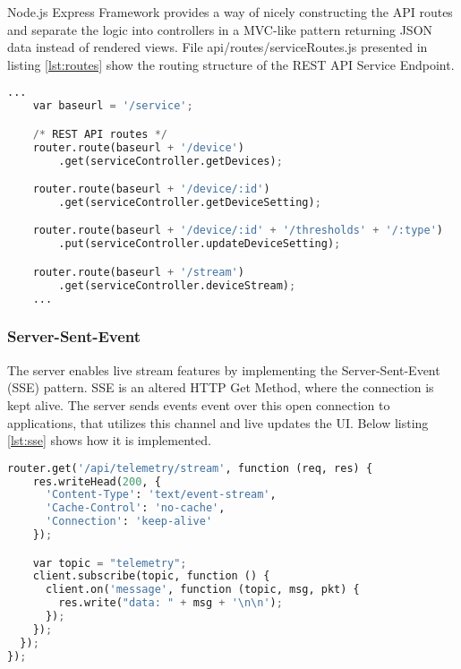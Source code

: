     Node.js Express Framework provides a way of nicely constructing the API routes and separate the logic into controllers in a MVC-like pattern returning JSON data instead of rendered views. File api/routes/serviceRoutes.js presented in listing \ref{lst:routes} show the routing structure of the REST API Service Endpoint. 

\begin{lstlisting}[language=Python, caption=Node.js REST API Routes, label={lst:routes}, basicstyle=\tiny]
    ...
    var baseurl = '/service';

    /* REST API routes */
    router.route(baseurl + '/device')
        .get(serviceController.getDevices);

    router.route(baseurl + '/device/:id')
        .get(serviceController.getDeviceSetting);

    router.route(baseurl + '/device/:id' + '/thresholds' + '/:type')
        .put(serviceController.updateDeviceSetting);

    router.route(baseurl + '/stream')
        .get(serviceController.deviceStream); 
    ...
\end{lstlisting}

\subsubsection{Server-Sent-Event}
The server enables live stream features by implementing the Server-Sent-Event (SSE) pattern. SSE is an altered HTTP Get Method, where the connection is kept alive. The server sends events event over this open connection to applications, that utilizes this channel and live updates the UI. Below listing \ref{lst:sse} shows how it is implemented.

\begin{lstlisting}[language=Python, caption=Server Sent Event, label={lst:sse}, basicstyle=\tiny]
    router.get('/api/telemetry/stream', function (req, res) {
    res.writeHead(200, {
      'Content-Type': 'text/event-stream',
      'Cache-Control': 'no-cache',
      'Connection': 'keep-alive'
    });

    var topic = "telemetry";
    client.subscribe(topic, function () {
      client.on('message', function (topic, msg, pkt) {
        res.write("data: " + msg + '\n\n');
      });
    });
  });
});
\end{lstlisting}

